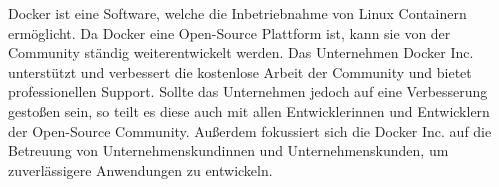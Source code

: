 \label{sec:ContainerAndDocker}

Docker ist eine Software, welche die Inbetriebnahme von Linux Containern ermöglicht. Da Docker eine Open-Source Plattform ist, kann sie von der Community ständig weiterentwickelt werden. Das Unternehmen Docker Inc. unterstützt und verbessert die kostenlose Arbeit der Community und bietet professionellen Support. Sollte das Unternehmen jedoch auf eine Verbesserung gestoßen sein, so teilt es diese auch mit allen Entwicklerinnen und Entwicklern der Open-Source Community. Außerdem fokussiert sich die Docker Inc. auf die Betreuung von Unternehmenskundinnen und Unternehmenskunden, um zuverlässigere Anwendungen zu entwickeln. \cite{Docker}

 
 
 
 
 
 
 
 
 
